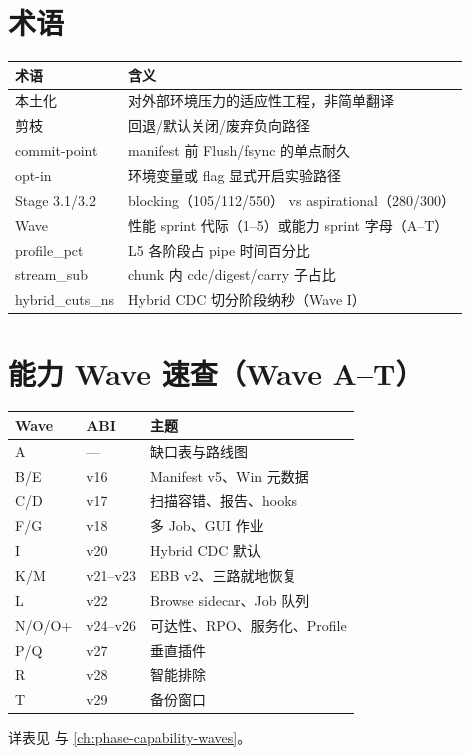 \section{术语}

\begin{longtable}{@{}lp{9cm}@{}}
\toprule
术语 & 含义 \\
\midrule
本土化 & 对外部环境压力的适应性工程，非简单翻译 \\
剪枝 & 回退/默认关闭/废弃负向路径 \\
commit-point & manifest 前 Flush/fsync 的单点耐久 \\
opt-in & 环境变量或 flag 显式开启实验路径 \\
Stage 3.1/3.2 & blocking（105/112/550） vs aspirational（280/300） \\
Wave & 性能 sprint 代际（1--5）或能力 sprint 字母（A--T） \\
profile\_pct & L5 各阶段占 pipe 时间百分比 \\
stream\_sub & chunk 内 cdc/digest/carry 子占比 \\
hybrid\_cuts\_ns & Hybrid CDC 切分阶段纳秒（Wave I） \\
\bottomrule
\end{longtable}

\section{能力 Wave 速查（Wave A--T）}

\begin{longtable}{@{}llp{8cm}@{}}
\toprule
Wave & ABI & 主题 \\
\midrule
A & — & 缺口表与路线图 \\
B/E & v16 & Manifest v5、Win 元数据 \\
C/D & v17 & 扫描容错、报告、hooks \\
F/G & v18 & 多 Job、GUI 作业 \\
I & v20 & Hybrid CDC 默认 \\
K/M & v21--v23 & EBB v2、三路就地恢复 \\
L & v22 & Browse sidecar、Job 队列 \\
N/O/O+ & v24--v26 & 可达性、RPO、服务化、Profile \\
P/Q & v27 & 垂直插件 \\
R & v28 & 智能排除 \\
T & v29 & 备份窗口 \\
\bottomrule
\end{longtable}

详表见  与 \cref{ch:phase-capability-waves}。
